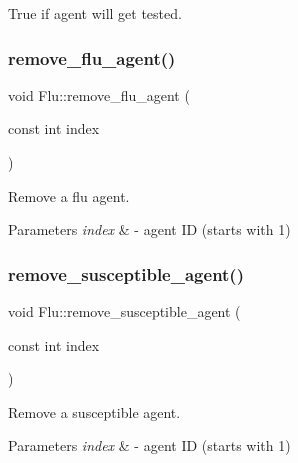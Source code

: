 True if agent will get tested. 

\mbox{\label{classFlu_a0106ecf7ba7e6db8f2b3cd5b5715537f}} 
\subsubsection{\texorpdfstring{remove\+\_\+flu\+\_\+agent()}{remove\_flu\_agent()}}
{\footnotesize\ttfamily void Flu\+::remove\+\_\+flu\+\_\+agent (\begin{DoxyParamCaption}\item[{const int}]{index }\end{DoxyParamCaption})}



Remove a flu agent. 


\begin{DoxyParams}{Parameters}
{\em index} & -\/ agent ID (starts with 1) \\
\hline
\end{DoxyParams}
\mbox{\label{classFlu_ace749e39454ab8afd3fda5de94b9ff98}} 
\subsubsection{\texorpdfstring{remove\+\_\+susceptible\+\_\+agent()}{remove\_susceptible\_agent()}}
{\footnotesize\ttfamily void Flu\+::remove\+\_\+susceptible\+\_\+agent (\begin{DoxyParamCaption}\item[{const int}]{index }\end{DoxyParamCaption})}



Remove a susceptible agent. 


\begin{DoxyParams}{Parameters}
{\em index} & -\/ agent ID (starts with 1) \\
\hline
\end{DoxyParams}
\mbox{\label{classFlu_af4537e15218d60518ccb9de9df2aa69c}} 
